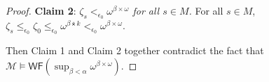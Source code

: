 \documentclass{article}
\numberwithin{theorem}{section}
\newcommand{\WF}{\mathsf{WF}}
\newcommand{\BME}{\mathsf{BME}}
\newcommand{\M}{\mathcal{M}}
\newcommand{\ntimes}{\dottimes}
\begin{document}
\begin{proof}
\textbf{Claim 2}: \emph{$\zeta_s <_{\epsilon_0} \omega^{\beta \times \omega}$ for all $s \in M$.} For all $s \in M$, $\zeta_s \leq_{\epsilon_0} \zeta_0 \leq_{\epsilon_0} \omega^{\beta \ntimes k} <_{\epsilon_0} \omega^{\beta \times \omega}$. 

Then Claim 1 and Claim 2 together contradict the fact that $\M \models \WF(\sup_{\beta < \alpha} \omega^{\beta \times \omega})$.











\end{proof}
\end{document}
